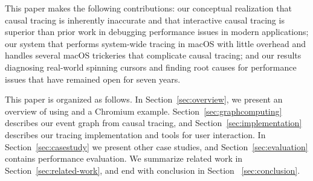 This paper makes the following contributions: our conceptual realization that
causal tracing is inherently inaccurate and that interactive causal tracing is
superior than prior work in debugging performance issues in modern
applications; our system \xxx that performs system-wide tracing in macOS with
little overhead and handles several macOS trickeries that complicate
causal tracing; and our results diagnosing real-world spinning cursors and
finding root causes for performance issues that have remained open for
seven years.

This paper is organized as follows. In Section~\ref{sec:overview}, we present
an overview of using \xxx and a Chromium example.
Section~\ref{sec:graphcomputing} describes our event graph from causal tracing,
and Section~\ref{sec:implementation} describes our
tracing implementation and tools for user interaction.
In Section~\ref{sec:casestudy} we present other case
studies, and Section~\ref{sec:evaluation} contains performance evaluation.
We summarize related work in Section~\ref{sec:related-work}, and end with
conclusion in Section ~\ref{sec:conclusion}.
